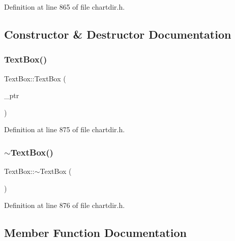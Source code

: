 Definition at line 865 of file chartdir.\+h.



\subsection{Constructor \& Destructor Documentation}
\mbox{\label{class_text_box_a46da0ed5f14f4d49cfb5ebbe449f395b}} 
\subsubsection{\texorpdfstring{Text\+Box()}{TextBox()}}
{\footnotesize\ttfamily Text\+Box\+::\+Text\+Box (\begin{DoxyParamCaption}\item[{Text\+Box\+Internal $\ast$}]{\+\_\+ptr }\end{DoxyParamCaption})\hspace{0.3cm}{\ttfamily [inline]}}



Definition at line 875 of file chartdir.\+h.

\mbox{\label{class_text_box_ac3cc88a3ac171658ebaf44b01f4adf80}} 
\subsubsection{\texorpdfstring{$\sim$\+Text\+Box()}{~TextBox()}}
{\footnotesize\ttfamily Text\+Box\+::$\sim$\+Text\+Box (\begin{DoxyParamCaption}{ }\end{DoxyParamCaption})\hspace{0.3cm}{\ttfamily [inline]}}



Definition at line 876 of file chartdir.\+h.



\subsection{Member Function Documentation}
\mbox{\label{class_text_box_ab5afee7f63b0c165717bfc28d050262f}} 
